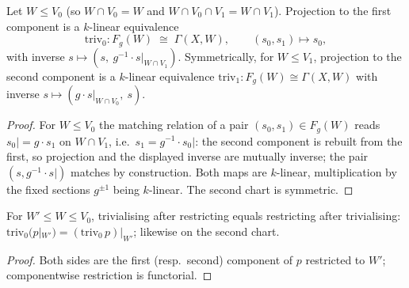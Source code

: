 \begin{definition}
  \label{pa-def:twistTriv}
  \leanok

  Let \(W \le V_0\) (so \(W \cap V_0 = W\) and \(W \cap V_0 \cap V_1 = W \cap V_1\)).
  Projection to the first component is a \(k\)-linear equivalence
  \[
    \mathrm{triv}_0 : F_g(W) \;\cong\; \Gamma(X, W), \qquad (s_0, s_1) \mapsto s_0,
  \]
  with inverse \(s \mapsto (s,\ g^{-1} \cdot s|_{W \cap V_1})\). Symmetrically, for
  \(W \le V_1\), projection to the second component is a \(k\)-linear equivalence
  \(\mathrm{triv}_1 : F_g(W) \cong \Gamma(X, W)\) with inverse
  \(s \mapsto (g \cdot s|_{W \cap V_0},\ s)\).
\end{definition}
\begin{proof}
  \leanok
  For \(W \le V_0\) the matching relation of a pair \((s_0, s_1) \in F_g(W)\) reads
  \(s_0| = g \cdot s_1\) on \(W \cap V_1\), i.e.\ \(s_1 = g^{-1} \cdot s_0|\): the second
  component is rebuilt from the first, so projection and the displayed inverse are
  mutually inverse; the pair \((s, g^{-1} \cdot s|)\) matches by construction. Both maps
  are \(k\)-linear, multiplication by the fixed sections \(g^{\pm 1}\) being
  \(k\)-linear. The second chart is symmetric.
\end{proof}

\begin{lemma}
  \label{pa-lem:twistTriv_res}
  \leanok

  For \(W' \le W \le V_0\), trivialising after restricting equals restricting after
  trivialising: \(\mathrm{triv}_0(p|_{W'}) = (\mathrm{triv}_0\, p)|_{W'}\); likewise on
  the second chart.
\end{lemma}
\begin{proof}
  \leanok
  Both sides are the first (resp.\ second) component of \(p\) restricted to \(W'\);
  componentwise restriction is functorial.
\end{proof}

